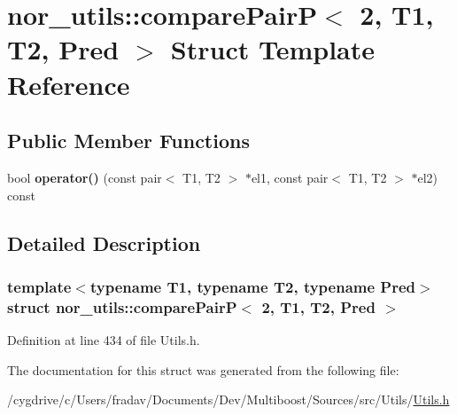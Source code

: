 \hypertarget{structnor__utils_1_1comparePairP_3_012_00_01T1_00_01T2_00_01Pred_01_4}{
\section{nor\_\-utils::comparePairP$<$ 2, T1, T2, Pred $>$ Struct Template Reference}
\label{structnor__utils_1_1comparePairP_3_012_00_01T1_00_01T2_00_01Pred_01_4}
}
\subsection*{Public Member Functions}
\begin{DoxyCompactItemize}
\item 
\hypertarget{structnor__utils_1_1comparePairP_3_012_00_01T1_00_01T2_00_01Pred_01_4_a2122e55682c6caff14dfc9c6f33e8593}{
bool {\bfseries operator()} (const pair$<$ T1, T2 $>$ $\ast$el1, const pair$<$ T1, T2 $>$ $\ast$el2) const }
\label{structnor__utils_1_1comparePairP_3_012_00_01T1_00_01T2_00_01Pred_01_4_a2122e55682c6caff14dfc9c6f33e8593}

\end{DoxyCompactItemize}


\subsection{Detailed Description}
\subsubsection*{template$<$typename T1, typename T2, typename Pred$>$struct nor\_\-utils::comparePairP$<$ 2, T1, T2, Pred $>$}



Definition at line 434 of file Utils.h.



The documentation for this struct was generated from the following file:\begin{DoxyCompactItemize}
\item 
/cygdrive/c/Users/fradav/Documents/Dev/Multiboost/Sources/src/Utils/\hyperlink{Utils_8h}{Utils.h}\end{DoxyCompactItemize}
